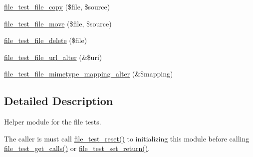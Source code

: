 \begin{DoxyCompactItemize}
\hyperlink{file__test_8module_af7f578a32030bdda21981e4453c1f6a2}{file\_\-test\_\-file\_\-copy} (\$file, \$source)
\item 
\hyperlink{file__test_8module_ada5a3deac30182fc0536a3834347be02}{file\_\-test\_\-file\_\-move} (\$file, \$source)
\item 
\hyperlink{file__test_8module_a26c064534c5098f4d1956918a8f370fb}{file\_\-test\_\-file\_\-delete} (\$file)
\item 
\hyperlink{file__test_8module_a10ba220fc77db12e5ff62d90d7cccd95}{file\_\-test\_\-file\_\-url\_\-alter} (\&\$uri)
\item 
\hyperlink{file__test_8module_af6864b64bb65463d96cc4de823bdc694}{file\_\-test\_\-file\_\-mimetype\_\-mapping\_\-alter} (\&\$mapping)
\end{DoxyCompactItemize}


\subsection{Detailed Description}
Helper module for the file tests.

The caller is must call \hyperlink{file__test_8module_ac3231cdae85b5f6631a201a2f56e9d84}{file\_\-test\_\-reset()} to initializing this module before calling \hyperlink{file__test_8module_a43842b551a9a076a33290c02b9c567b0}{file\_\-test\_\-get\_\-calls()} or \hyperlink{file__test_8module_a5af89506d8703c84616e6595bc088a7f}{file\_\-test\_\-set\_\-return()}. 

